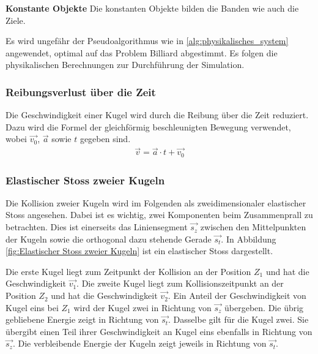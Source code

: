 \textbf{Konstante Objekte}
Die konstanten Objekte bilden die Banden wie auch die Ziele.

Es wird ungefähr der Pseudoalgorithmus wie in \ref{alg:physikalisches_system} angewendet, optimal auf das Problem \glqq{}Billiard\grqq{}
abgestimmt. Es folgen die physikalischen Berechnungen zur Durchführung der Simulation.


\subsubsection{Reibungsverlust über die Zeit}
Die Geschwindigkeit einer Kugel wird durch die Reibung über die Zeit reduziert. Dazu wird die Formel der gleichförmig
beschleunigten Bewegung verwendet, wobei $\vec{v_0}$, $\vec{a}$ sowie $t$ gegeben sind.
\begin{align}
    \vec{v} = \vec{a} \cdot t + \vec{v_0}
\end{align}

\newpage
\subsubsection{Elastischer Stoss zweier Kugeln}\label{kap:simulation:elastischer_stoss_zweier_kugeln}
Die Kollision zweier Kugeln wird im Folgenden als zweidimensionaler elastischer Stoss \cite{wiki.elastischer_stoss_physik:1} angesehen.
Dabei ist es wichtig, zwei Komponenten beim Zusammenprall zu betrachten.
Dies ist einerseits das Liniensegment $\vec{s_z}$ zwischen den Mittelpunkten
der Kugeln sowie die orthogonal dazu stehende Gerade $\vec{s_t}$.
In Abbildung \ref{fig:Elastischer Stoss zweier Kugeln} ist ein elastischer Stoss dargestellt.

Die erste Kugel liegt zum Zeitpunkt der Kollision an der Position $Z_1$ und hat die Geschwindigkeit $\vec{v_1}$.
Die zweite Kugel liegt zum Kollisionszeitpunkt an der Position $Z_2$ und hat die Geschwindigkeit $\vec{v_2}$.
Ein Anteil der Geschwindigkeit von Kugel eins bei $Z_1$ wird der Kugel zwei in Richtung von $\vec{s_z}$ übergeben.
Die übrig gebliebene Energie zeigt in Richtung von $\vec{s_t}$.
Dasselbe gilt für die Kugel zwei.
Sie übergibt einen Teil ihrer Geschwindigkeit an Kugel eins ebenfalls in Richtung von $\vec{s_z}$.
Die verbleibende Energie der Kugeln zeigt jeweils in Richtung von $\vec{s_t}$.

